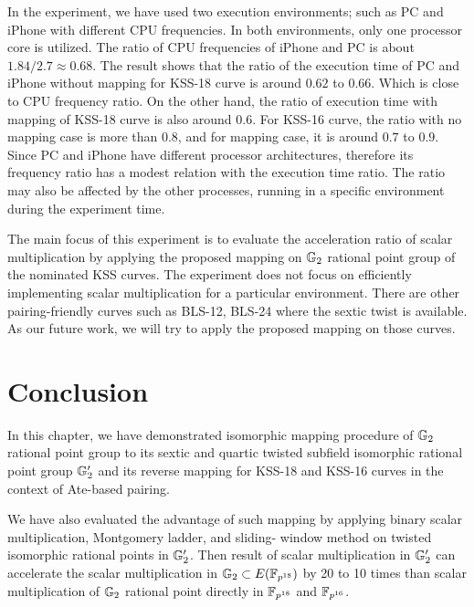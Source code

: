 In the experiment, we have used two execution environments; such as PC and iPhone with different CPU frequencies. 
In both environments, only one processor core is utilized.
 The ratio of CPU frequencies of iPhone and PC is about $1.84 / 2.7 \approx 0.68$. 
The result shows that the ratio of the execution time of PC and iPhone without mapping for KSS-18 curve is around $0.62$ to $0.66$.
Which is close to CPU frequency ratio.
On the other hand, the ratio of execution time with mapping of KSS-18 curve is also around $0.6$. 
For KSS-16 curve, the ratio with no mapping case is more than $0.8$, and for mapping case, it is around $0.7$ to $0.9$.   
Since PC and iPhone have different processor architectures, therefore its frequency ratio has a modest relation with the execution time ratio. 
The ratio may also be affected by the other processes, running in a specific environment during the experiment time.

The main focus of this experiment is to evaluate the acceleration ratio of scalar multiplication by applying the proposed mapping on ${\mathbb{G}}_{2}$ rational point group of the nominated KSS curves. The experiment does not focus on efficiently implementing scalar multiplication for a particular environment. There are other pairing-friendly curves such as BLS-12, BLS-24 \cite{JC:FreScoTes10} where the sextic twist is available. As our future work, we will try to apply the proposed mapping on those curves.


\section{Conclusion}
In this chapter, we have demonstrated isomorphic mapping procedure of ${\mathbb{G}}_{2}$ rational point group to its sextic and quartic twisted subfield isomorphic rational point group ${\mathbb{G}}_{2}'$  and its reverse mapping for KSS-18 and KSS-16 curves in the context of Ate-based pairing. 

We have also evaluated the advantage of such mapping by applying binary scalar multiplication, Montgomery ladder, and sliding- window method on twisted isomorphic rational points in ${\mathbb{G}}_{2}'$. 
Then result of  scalar multiplication in ${\mathbb{G}}_{2}'$ can accelerate the scalar multiplication in ${\mathbb{G}}_{2} \subset E(\mathbb{F}_{p^{18}})$ by   20 to 10 times than scalar multiplication of ${\mathbb{G}}_{2}$ rational point directly in $\mathbb{F}_{p^{18}}$ and $\mathbb{F}_{p^{16}}$. 
